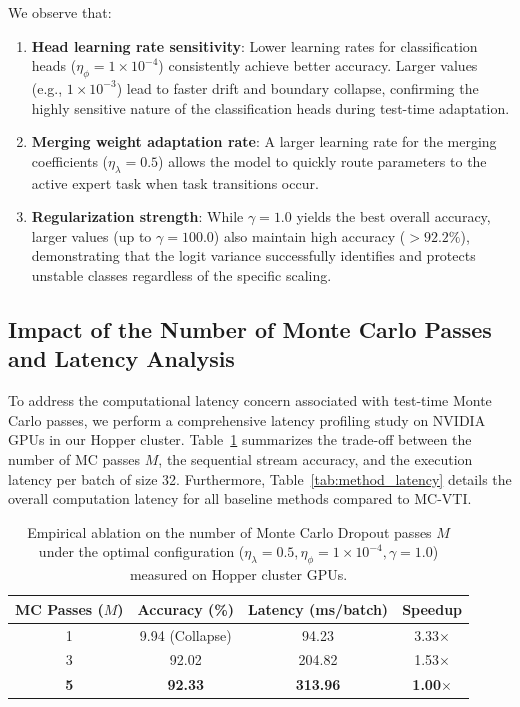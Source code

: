 \documentclass{article}
\theoremstyle{plain}
\theoremstyle{definition}
\theoremstyle{remark}
\begin{document}
We observe that:
\begin{enumerate}
  \item \textbf{Head learning rate sensitivity}: Lower learning rates for classification heads ($\eta_\phi = 1\times 10^{-4}$) consistently achieve better accuracy. Larger values (e.g., $1\times 10^{-3}$) lead to faster drift and boundary collapse, confirming the highly sensitive nature of the classification heads during test-time adaptation.
  \item \textbf{Merging weight adaptation rate}: A larger learning rate for the merging coefficients ($\eta_\lambda = 0.5$) allows the model to quickly route parameters to the active expert task when task transitions occur.
  \item \textbf{Regularization strength}: While $\gamma = 1.0$ yields the best overall accuracy, larger values (up to $\gamma=100.0$) also maintain high accuracy ($>92.2\%$), demonstrating that the logit variance successfully identifies and protects unstable classes regardless of the specific scaling.
\end{enumerate}

\subsection{Impact of the Number of Monte Carlo Passes and Latency Analysis}
To address the computational latency concern associated with test-time Monte Carlo passes, we perform a comprehensive latency profiling study on NVIDIA GPUs in our Hopper cluster. Table~\ref{tab:ablation_passes} summarizes the trade-off between the number of MC passes $M$, the sequential stream accuracy, and the execution latency per batch of size 32. Furthermore, Table~\ref{tab:method_latency} details the overall computation latency for all baseline methods compared to MC-VTI.

\begin{table}[ht]
  \caption{Empirical ablation on the number of Monte Carlo Dropout passes $M$ under the optimal configuration ($\eta_\lambda=0.5, \eta_\phi=1\times 10^{-4}, \gamma=1.0$) measured on Hopper cluster GPUs.}
  \label{tab:ablation_passes}
  \vskip 0.15in
  \begin{center}
  \begin{small}
  \begin{sc}
  \begin{tabular}{cccc}
    \toprule
    MC Passes ($M$) & Accuracy (\%) & Latency (ms/batch) & Speedup \\
    \midrule
    1  & 9.94 (Collapse) & 94.23 & 3.33$\times$ \\
    3  & 92.02 & 204.82 & 1.53$\times$ \\
    \textbf{5}  & \textbf{92.33} & \textbf{313.96} & \textbf{1.00$\times$} \\
    \bottomrule
  \end{tabular}
  \end{sc}
  \end{small}
  \end{center}
  \vskip -0.1in
\end{table}
\end{document}
